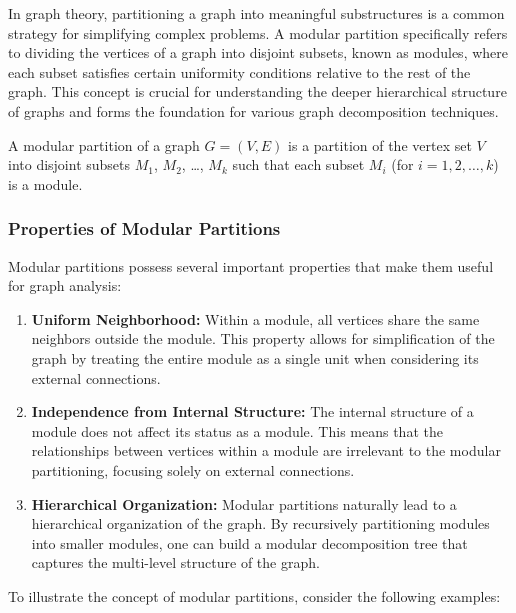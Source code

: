 In graph theory, partitioning a graph into meaningful substructures is a common strategy for simplifying complex problems.
A modular partition specifically refers to dividing the vertices of a graph into disjoint subsets, known as modules, where each subset satisfies certain uniformity conditions relative to the rest of the graph.
This concept is crucial for understanding the deeper hierarchical structure of graphs and forms the foundation for various graph decomposition techniques.

\begin{mydef}
    A modular partition of a graph $G = (V, E)$ is a partition of the vertex set $V$ into disjoint subsets $M_1$, $M_2$, \ldots, $M_k$ such that each subset $M_i$ (for $i = 1, 2, \ldots, k$) is a module.
\end{mydef}

\subsubsection*{Properties of Modular Partitions}

Modular partitions possess several important properties that make them useful for graph analysis:

\begin{enumerate}
    \item \textbf{Uniform Neighborhood:} Within a module, all vertices share the same neighbors outside the module.
    This property allows for simplification of the graph by treating the entire module as a single unit when considering its external connections.
    \item \textbf{Independence from Internal Structure:} The internal structure of a module does not affect its status as a module.
    This means that the relationships between vertices within a module are irrelevant to the modular partitioning, focusing solely on external connections.
    \item \textbf{Hierarchical Organization:} Modular partitions naturally lead to a hierarchical organization of the graph.
    By recursively partitioning modules into smaller modules, one can build a modular decomposition tree that captures the multi-level structure of the graph.
\end{enumerate}

To illustrate the concept of modular partitions, consider the following examples:

